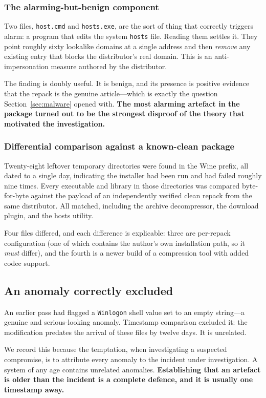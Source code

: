 \subsubsection{The alarming-but-benign component}
Two files, \verb|host.cmd| and \verb|hosts.exe|, are the sort of thing that
correctly triggers alarm: a program that edits the system \verb|hosts| file.
Reading them settles it. They point roughly sixty lookalike domains at a single
address and then \emph{remove} any existing entry that blocks the distributor's
real domain. This is an anti-impersonation measure authored by the distributor.

The finding is doubly useful. It is benign, and its presence is positive evidence
that the repack is the genuine article---which is exactly the question
Section~\ref{sec:malware} opened with. \textbf{The most alarming artefact in the
package turned out to be the strongest disproof of the theory that motivated the
investigation.}

\subsubsection{Differential comparison against a known-clean package}
Twenty-eight leftover temporary directories were found in the Wine prefix, all
dated to a single day, indicating the installer had been run and had failed
roughly nine times. Every executable and library in those directories was
compared byte-for-byte against the payload of an independently verified clean
repack from the same distributor. All matched, including the archive
decompressor, the download plugin, and the hosts utility.

Four files differed, and each difference is explicable: three are per-repack
configuration (one of which contains the author's own installation path, so it
\emph{must} differ), and the fourth is a newer build of a compression tool with
added codec support.

\subsection{An anomaly correctly excluded}

An earlier pass had flagged a \verb|Winlogon| shell value set to an empty
string---a genuine and serious-looking anomaly. Timestamp comparison excluded it:
the modification predates the arrival of these files by twelve days. It is
unrelated.

We record this because the temptation, when investigating a suspected compromise,
is to attribute every anomaly to the incident under investigation. A system of
any age contains unrelated anomalies. \textbf{Establishing that an artefact is
older than the incident is a complete defence, and it is usually one timestamp
away.}

